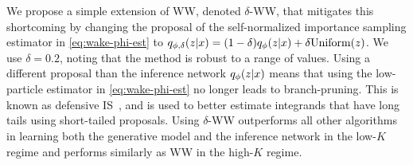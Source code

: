We propose a simple extension of \gls{WW}, denoted $\delta$-\acrshort{WW}, that mitigates this shortcoming by changing the proposal of the self-normalized importance sampling estimator in \cref{eq:wake-phi-est} to \(q_{\phi, \delta}(z \lvert x) = (1 - \delta) q_\phi(z \lvert x) + \delta \mathrm{Uniform}(z)\).
We use $\delta = 0.2$, noting that the method is robust to a range of values.
Using a different proposal than the inference network $q_\phi(z \lvert x)$ means that using the low-particle estimator in \cref{eq:wake-phi-est} no longer leads to branch-pruning.
This is known as defensive \acrlong{IS}~\citep{hesterberg1995weighted}, and is used to better estimate integrands that have long tails using short-tailed proposals.
Using $\delta$-\gls{WW} outperforms all other algorithms in learning both the generative model and the inference network in the low-$K$ regime and performs similarly as \gls{WW} in the high-$K$ regime.


